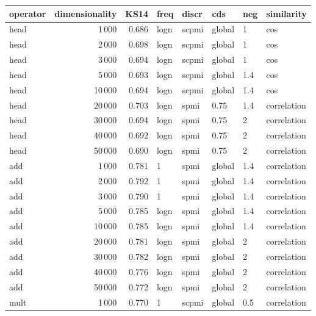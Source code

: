 \begin{tabular}{lrrlllll}
\toprule
operator &  dimensionality &   KS14 &  freq &  discr &     cds &  neg &     similarity \\
\midrule
    head &            1\,000 &  0.686 &  logn &  scpmi &  global &    1 &            cos \\
    head &            2\,000 &  0.698 &  logn &  scpmi &  global &    1 &            cos \\
    head &            3\,000 &  0.694 &  logn &  scpmi &  global &    1 &            cos \\
    head &            5\,000 &  0.693 &  logn &  scpmi &  global &  1.4 &            cos \\
    head &           10\,000 &  0.694 &  logn &  scpmi &  global &  1.4 &            cos \\
    head &           20\,000 &  0.703 &  logn &   spmi &    0.75 &  1.4 &    correlation \\
    head &           30\,000 &  0.694 &  logn &   spmi &    0.75 &    2 &    correlation \\
    head &           40\,000 &  0.692 &  logn &   spmi &    0.75 &    2 &    correlation \\
    head &           50\,000 &  0.690 &  logn &   spmi &    0.75 &    2 &    correlation \\
     add &            1\,000 &  0.781 &     1 &   spmi &  global &  1.4 &    correlation \\
     add &            2\,000 &  0.792 &     1 &   spmi &  global &  1.4 &    correlation \\
     add &            3\,000 &  0.790 &     1 &   spmi &  global &  1.4 &    correlation \\
     add &            5\,000 &  0.785 &  logn &   spmi &  global &  1.4 &    correlation \\
     add &           10\,000 &  0.785 &  logn &   spmi &  global &  1.4 &    correlation \\
     add &           20\,000 &  0.781 &  logn &   spmi &  global &    2 &    correlation \\
     add &           30\,000 &  0.782 &  logn &   spmi &  global &    2 &    correlation \\
     add &           40\,000 &  0.776 &  logn &   spmi &  global &    2 &    correlation \\
     add &           50\,000 &  0.772 &  logn &   spmi &  global &    2 &    correlation \\
    mult &            1\,000 &  0.770 &     1 &  scpmi &  global &  0.5 &    correlation \\

\end{tabular}
